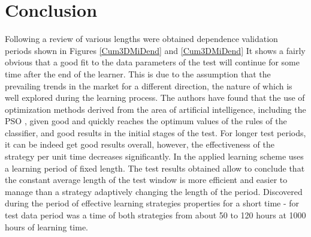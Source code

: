 \documentclass{tewiart}
\begin{document}
\section{Conclusion}

Following a review of various lengths were obtained dependence validation periods shown in Figures \ref{Cum3DMiDend} and \ref{Cum3DMiDend} It shows a fairly obvious that a good fit to the data parameters of the test will continue for some time after the end of the learner. This is due to the assumption that the prevailing trends in the market for a different direction, the nature of which is well explored during the learning process. The authors have found that the use of optimization methods derived from the area of artificial intelligence, including the PSO \cite{Kennedy}, given good and quickly reaches the optimum values of the rules of the classifier, and good results in the initial stages of the test. For longer test periods, it can be indeed get good results overall, however, the effectiveness of the strategy per unit time decreases significantly. In the applied learning scheme uses a learning period of fixed length. The test results obtained allow to conclude that the constant average length of the test window is more efficient and easier to manage than a strategy adaptively changing the length of the period. Discovered during the period of effective learning strategies properties for a short time - for test data period was a time of both strategies from about 50 to 120 hours at 1000 hours of learning time. \\
\end{document}
